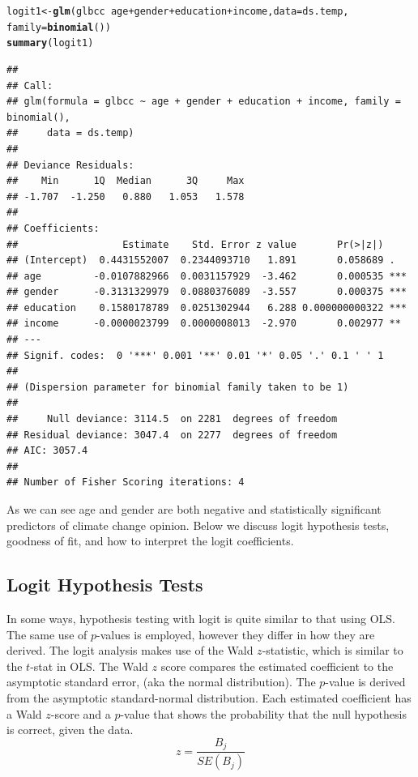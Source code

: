 \documentclass[11pt,openany]{book}\usepackage[]{graphicx}\usepackage[]{color}
\makeatletter
\newcommand{\hlopt}[1]{\textcolor[rgb]{0,0,0}{#1}}%
\newcommand{\hlstd}[1]{\textcolor[rgb]{0.345,0.345,0.345}{#1}}%
\newcommand{\hlkwb}[1]{\textcolor[rgb]{0.69,0.353,0.396}{#1}}%
\newcommand{\hlkwc}[1]{\textcolor[rgb]{0.333,0.667,0.333}{#1}}%
\newcommand{\hlkwd}[1]{\textcolor[rgb]{0.737,0.353,0.396}{\textbf{#1}}}%
\newenvironment{kframe}{%
 \def\at@end@of@kframe{}%
 \ifinner\ifhmode%
  \def\at@end@of@kframe{\end{minipage}}%
  \begin{minipage}{\columnwidth}%
 \fi\fi%
 \def\FrameCommand##1{\hskip\@totalleftmargin \hskip-\fboxsep
 \colorbox{shadecolor}{##1}\hskip-\fboxsep
     \hskip-\linewidth \hskip-\@totalleftmargin \hskip\columnwidth}%
 \MakeFramed {\advance\hsize-\width
   \@totalleftmargin\z@ \linewidth\hsize
   \@setminipage}}%
 {\par\unskip\endMakeFramed%
 \at@end@of@kframe}
\newenvironment{knitrout}{}{} %
\renewenvironment{knitrout}{\begin{singlespace}}{\end{singlespace}}
\makeatother
\begin{document}
\begin{knitrout}
\color{fgcolor}\begin{kframe}
\begin{alltt}
\hlstd{logit1} \hlkwb{<-} \hlkwd{glm}\hlstd{(glbcc} \hlopt{~} \hlstd{age} \hlopt{+} \hlstd{gender} \hlopt{+} \hlstd{education} \hlopt{+} \hlstd{income,} \hlkwc{data} \hlstd{= ds.temp,}
    \hlkwc{family} \hlstd{=} \hlkwd{binomial}\hlstd{())}
\hlkwd{summary}\hlstd{(logit1)}
\end{alltt}
\begin{verbatim}
## 
## Call:
## glm(formula = glbcc ~ age + gender + education + income, family = binomial(), 
##     data = ds.temp)
## 
## Deviance Residuals: 
##    Min      1Q  Median      3Q     Max  
## -1.707  -1.250   0.880   1.053   1.578  
## 
## Coefficients:
##                  Estimate    Std. Error z value       Pr(>|z|)    
## (Intercept)  0.4431552007  0.2344093710   1.891       0.058689 .  
## age         -0.0107882966  0.0031157929  -3.462       0.000535 ***
## gender      -0.3131329979  0.0880376089  -3.557       0.000375 ***
## education    0.1580178789  0.0251302944   6.288 0.000000000322 ***
## income      -0.0000023799  0.0000008013  -2.970       0.002977 ** 
## ---
## Signif. codes:  0 '***' 0.001 '**' 0.01 '*' 0.05 '.' 0.1 ' ' 1
## 
## (Dispersion parameter for binomial family taken to be 1)
## 
##     Null deviance: 3114.5  on 2281  degrees of freedom
## Residual deviance: 3047.4  on 2277  degrees of freedom
## AIC: 3057.4
## 
## Number of Fisher Scoring iterations: 4
\end{verbatim}
\end{kframe}
\end{knitrout}
\noindent As we can see age and gender are both negative and statistically significant predictors of climate change opinion. Below we discuss logit hypothesis tests, goodness of fit, and how to interpret the logit coefficients.  

\subsection{Logit Hypothesis Tests} 

In some ways, hypothesis testing with logit is quite similar to that using OLS. The same use of  $p$-values is employed, however they differ in
how they are derived. The logit analysis makes use of the Wald $z$-statistic, which is similar to the $t$-stat in OLS. The Wald $z$ score compares the estimated coefficient to the asymptotic standard error, (aka the normal distribution). The $p$-value is derived from the asymptotic standard-normal distribution. Each estimated coefficient has a Wald $z$-score and a $p$-value that shows the probability that the null hypothesis is correct, given the data. 
\begin{equation}
  \label{eq:wald}
  z = \frac{B_j}{SE(B_j)} 
\end{equation}
 
\end{document}
